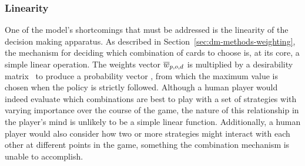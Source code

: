 
\subsubsection*{Linearity}
\label{sec:disc-shortcomings-linearity}


One of the model's shortcomings that must be addressed is the linearity
of the decision making apparatus.
%
As described in Section~\ref{sec:dm-methods-weighting},
the mechanism for deciding which combination of cards to choose is,
at its core,
a simple linear operation.
%
The weights vector $\overline{w}_{p,o,d}$ is multiplied by a desirability matrix \Smat\
to produce a probability vector \pvec,
from which the maximum value is chosen when the policy is strictly followed.
%
Although a human player would indeed evaluate which combinations are best
to play with a set of strategies with varying importance over the course
of the game,
the nature of this relationship in the player's mind is unlikely
to be a simple linear function.
%
Additionally,
a human player would also consider how two or more strategies might interact
with each other at different points in the game,
something the combination mechanism is unable to accomplish.

